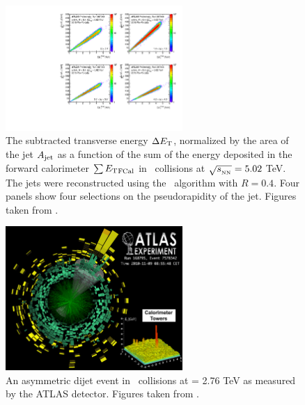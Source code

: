 \begin{figure}[htbp!]
	\centering
	\includegraphics[width=0.6\textwidth]{figures/setup/subtr_energy} %
	\caption{
	The subtracted transverse energy $\Delta \mbox{$E_{\mathrm{T}}$}$, normalized by the area of the jet $A_{\rm{jet}}$ as a function of the sum of the energy deposited in the forward calorimeter $\sum \mbox{$E_{\mathrm{T}}$}_{\rm FCal}$ in \pbpb\ collisions at $\mbox{$\sqrt{s_{_\text{NN}}}$} = 5.02$ TeV.
	The jets were reconstructed using the \antikt\ algorithm with $R = 0.4$.
	Four panels show four selections on the pseudorapidity of the jet.
	Figures taken from \cite{perfPlots}.}	
	\label{fig:subtr_energy}
\end{figure}


\begin{figure}[htbp!]
	\centering
	\includegraphics[width=0.6\textwidth]{figures/setup/jet_event_display} %
	\caption{
	An asymmetric dijet event in \pbpb\ collisions at \sqrtsnn = 2.76 TeV as measured by the ATLAS detector. 
	Figures taken from \cite{atlasRun1EventDisplay}.}	
	\label{fig:jet_event_display}
\end{figure}

